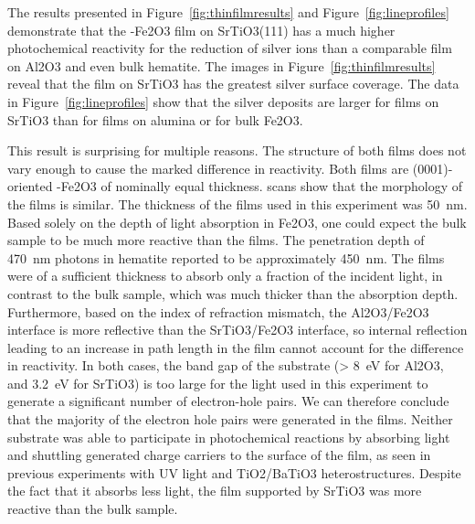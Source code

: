 \documentclass[12pt,%
              twoside,
               letterpaper]{uiothesis}
\begin{document}
The results presented in Figure~\ref{fig:thinfilmresults} and Figure~\ref{fig:lineprofiles}
demonstrate that the \textalpha-Fe2O3 film on SrTiO3(111) has a much higher
photochemical reactivity for the reduction of silver ions than a comparable film on
Al2O3 and even bulk hematite.  The images in Figure~\ref{fig:thinfilmresults} reveal that
the film on SrTiO3 has the greatest silver surface coverage. The data in
Figure~\ref{fig:lineprofiles} show that the silver deposits are larger for films on SrTiO3
than for films on alumina or for bulk Fe2O3. 

This result is surprising for multiple reasons.  The structure of both films does not vary
enough to cause the marked difference in reactivity. Both films are (0001)-oriented
\textalpha-Fe2O3 of nominally equal thickness.   scans show that the
morphology of the films is similar. The thickness of the films used in this experiment was
\texttildelow\SI{50}{\nano\meter}. Based solely on the depth of light absorption in
Fe2O3, one could expect the bulk sample to be much more reactive than the films.  The
penetration depth of \SI{470}{\nano\meter} photons in hematite reported to be
approximately \SI{450}{\nano\meter}.\cite{Marusak:1980gc}  The films were of a sufficient
thickness to absorb only a fraction of the incident light, in contrast to the bulk sample,
which was much thicker than the absorption depth. Furthermore, based on the index of
refraction mismatch, the Al2O3/Fe2O3 interface is more reflective than the
SrTiO3/Fe2O3 interface, so internal reflection leading to an increase in path
length in the film cannot account for the difference in reactivity.  In both cases, the
band gap of the substrate (> \SI{8}{\electronvolt} for Al2O3,\cite{French:1998wj} and
\SI{3.2}{\electronvolt}  for SrTiO3\cite{Cardona:1965vw}) is too large for the light
used in this experiment to generate a significant number of electron-hole pairs.  We can
therefore conclude that the majority of the electron hole pairs were generated in the
films. Neither substrate was able to participate in photochemical reactions by absorbing
light and shuttling generated charge carriers to the surface of the film, as seen in
previous experiments with UV light and TiO2/BaTiO3
heterostructures.\cite{Burbure:2010ti,Burbure:2010go}  Despite the fact that it absorbs
less light, the film supported by SrTiO3 was more reactive than the bulk sample.
\end{document}
